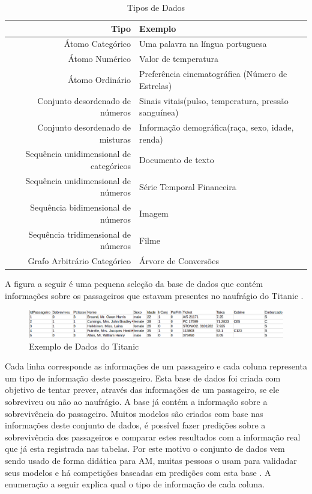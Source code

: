 \begin{table}[h]
\centering
\caption{Tipos de Dados}
\vspace{0.5cm}
\begin{tabular}{r|lr}

\hline 
Tipo & Exemplo  \\ %
\hline                               %
Átomo Categórico        & Uma palavra na língua portuguesa \\
\hline   
Átomo Numérico & Valor de temperatura \\
\hline 
Átomo Ordinário           & Preferência cinematográfica (Número de Estrelas) \\
\hline 
Conjunto desordenado de números       & Sinais vitais(pulso, temperatura, pressão sanguínea)\\
\hline 
Conjunto desordenado de misturas     & Informação demográfica(raça, sexo, idade, renda)\\
\hline 
Sequência unidimensional de categóricos       & Documento de texto\\
\hline 
Sequência unidimensional de números       & Série Temporal Financeira\\
\hline 
Sequência bidimensional de números      & Imagem\\
\hline 
Sequência tridimensional de números       & Filme\\
\hline 
Grafo Arbitrário Categórico       & Árvore de Conversões\\
 \hline 
\end{tabular}
\end{table}

A figura a seguir é uma pequena seleção da base de dados que contém informações sobre os passageiros que estavam presentes no naufrágio do Titanic \cite{titanic2012}. 

\begin{figure}[!h]
\centering
\includegraphics[keepaspectratio=true,scale=0.40]
{figuras/dataEg.eps}
\caption{Exemplo de Dados do Titanic}
\label{data_titatic}
\end{figure}

Cada linha corresponde as informações de um passageiro e cada coluna representa um tipo de informação deste passageiro. Esta base de dados foi criada com objetivo de tentar prever, através das informações de um passageiro, se ele sobreviveu ou não ao naufrágio. A base já contém a informação sobre a sobrevivência do passageiro. Muitos modelos são criados com base nas informações deste conjunto de dados, é possível fazer predições sobre a sobrevivência dos passageiros e comparar estes resultados com a informação real que já esta registrada nas tabelas. Por este motivo o conjunto de dados vem sendo usado de forma didática para AM, muitas pessoas o usam para validadar seus modelos e há competições baseadas em predições com esta base \cite{titanic2011}. A enumeração a seguir explica qual o tipo de informação de cada coluna. 


